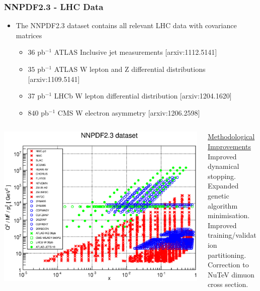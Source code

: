 \documentclass[10pt]{beamer}
\begin{document}
\begin{frame}
\frametitle{NNPDF2.3 - LHC Data}
\begin{itemize}
\item<1->{ \small The NNPDF2.3 dataset contains all relevant LHC data with covariance matrices }
 \begin{itemize}
 \item<1->  $36$ pb$^{-1}$ ATLAS Inclusive jet measurements \hfill  {\color{blue}[arxiv:1112.5141]}
  \item<1->  $35$ pb$^{-1}$  ATLAS W lepton and Z differential distributions \hfill{\color{blue}[arxiv:1109.5141]}
   \item<1->  $37$ pb$^{-1}$ LHCb W lepton differential distribution \hfill {\color{blue}[arxiv:1204.1620]}
  \item<1-> $840$ pb$^{-1}$ CMS  W electron asymmetry \hfill {\color{blue}[arxiv:1206.2598]}

\end{itemize}
\end{itemize}

\begin{columns}
  \begin{column}{0.5\textwidth}
   \includegraphics[width=1.0\textwidth]{kin23}
  \end{column}

  \begin{column}{0.5\textwidth}
    \small
\underline{Methodological Improvements}\\
\vskip10pt
Improved dynamical stopping.\\
Expanded genetic algorithm minimisation.\\
Improved training/validation partitioning. \\
Correction to NuTeV dimuon cross section.


\end{column}
\end{columns}
\end{frame}
\end{document}
